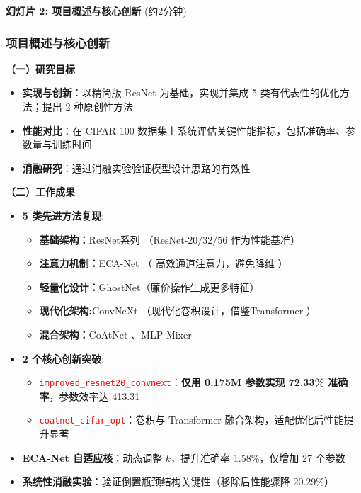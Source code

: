 \documentclass[10pt]{beamer}
\begin{document}
\begin{frame}{\textbf{幻灯片 2: 项目概述与核心创新} (约2分钟)}
\frametitle{项目概述与核心创新}

\textbf{（一）研究目标}

\vspace{0.5em}
\begin{itemize}
    \item \textbf{实现与创新}：以精简版 ResNet 为基础，实现并集成 5 类有代表性的优化方法；提出 2 种原创性方法
    \item \textbf{性能对比}：在 CIFAR-100 数据集上系统评估关键性能指标，包括准确率、参数量与训练时间
    \item \textbf{消融研究}：通过消融实验验证模型设计思路的有效性
\end{itemize}

\vspace{1em}
\textbf{（二）工作成果}

\vspace{0.5em}
\begin{itemize}
    \item \textbf{5 类先进方法复现}:
        \begin{itemize}
            \item \textbf{基础架构：}ResNet系列  （ResNet-20/32/56 作为性能基准）\cite{He2016Deep}
            \item \textbf{注意力机制：}ECA-Net （ 高效通道注意力，避免降维 ）\cite{Wang_2020_CVPR}
            \item \textbf{轻量化设计：}GhostNet（廉价操作生成更多特征） \cite{Han2020GhostNet}
            \item \textbf{现代化架构:}ConvNeXt （现代化卷积设计，借鉴Transformer ）\cite{Liu2022ConvNet}
            \item \textbf{混合架构：}CoAtNet \cite{Dai2021CoAtNet}、MLP-Mixer\cite{Tolstikhin2021MLPMixer}
        \end{itemize}

    
    \item \textbf{2 个核心创新突破}:
    \begin{itemize}
        \item \textcolor{red}{\texttt{improved\_resnet20\_convnext}}：\textbf{仅用 0.175M 参数实现 72.33\% 准确率}，参数效率达 413.31
        \item \textcolor{red}{\texttt{coatnet\_cifar\_opt}}：卷积与 Transformer 融合架构，适配优化后性能提升显著
    \end{itemize}
    \item \textbf{ECA-Net 自适应核}：动态调整 $k$，提升准确率 1.58\%，仅增加 27 个参数
    \item \textbf{系统性消融实验}：验证倒置瓶颈结构关键性（移除后性能骤降 20.29\%）
\end{itemize}

\end{frame}
\end{document}
